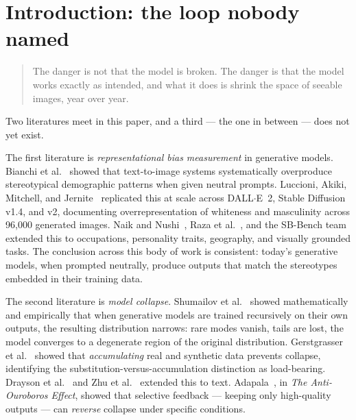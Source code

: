 \documentclass[sigconf,nonacm]{acmart}
\newenvironment{epigraphquote}{%
  \begin{quote}\itshape\small
}{%
  \end{quote}
}
\begin{document}

\maketitle

\section{Introduction: the loop nobody named}

\begin{epigraphquote}
The danger is not that the model is broken. The danger is that the model works exactly as intended, and what it does is shrink the space of seeable images, year over year.
\end{epigraphquote}

Two literatures meet in this paper, and a third --- the one in between --- does not yet exist.

The first literature is \emph{representational bias measurement} in generative models. Bianchi et al.~\cite{bianchi2023easily} showed that text-to-image systems systematically overproduce stereotypical demographic patterns when given neutral prompts. Luccioni, Akiki, Mitchell, and Jernite~\cite{luccioni2023stable} replicated this at scale across DALL$\cdot$E~2, Stable Diffusion v1.4, and v2, documenting overrepresentation of whiteness and masculinity across 96{,}000 generated images. Naik and Nushi~\cite{naik2023social}, Raza et al.~\cite{raza2025prompting}, and the SB-Bench team~\cite{sbbench2025} extended this to occupations, personality traits, geography, and visually grounded tasks. The conclusion across this body of work is consistent: today's generative models, when prompted neutrally, produce outputs that match the stereotypes embedded in their training data.

The second literature is \emph{model collapse}. Shumailov et al.~\cite{shumailov2024curse} showed mathematically and empirically that when generative models are trained recursively on their own outputs, the resulting distribution narrows: rare modes vanish, tails are lost, the model converges to a degenerate region of the original distribution. Gerstgrasser et al.~\cite{gerstgrasser2024inevitable} showed that \emph{accumulating} real and synthetic data prevents collapse, identifying the substitution-versus-accumulation distinction as load-bearing. Drayson et al.~\cite{drayson2025detection} and Zhu et al.~\cite{zhu2024synthesize} extended this to text. Adapala~\cite{adapala2025antiouroboros}, in \emph{The Anti-Ouroboros Effect}, showed that selective feedback --- keeping only high-quality outputs --- can \emph{reverse} collapse under specific conditions.
\end{document}
